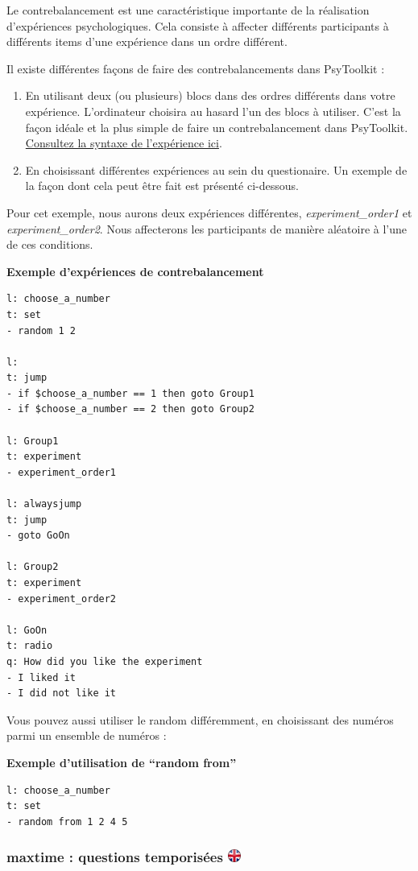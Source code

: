 \documentclass[
]{book}
\providecommand{\tightlist}{%
  \setlength{\itemsep}{0pt}\setlength{\parskip}{0pt}}
\begin{document}
Le contrebalancement est une caractéristique importante de la réalisation d'expériences psychologiques. Cela consiste à affecter différents participants à différents items d'une expérience dans un ordre différent.

Il existe différentes façons de faire des contrebalancements dans PsyToolkit :

\begin{enumerate}
\def\labelenumi{\arabic{enumi}.}
\tightlist
\item
  En utilisant deux (ou plusieurs) blocs dans des ordres différents dans votre expérience. L'ordinateur choisira au hasard l'un des blocs à utiliser. C'est la façon idéale et la plus simple de faire un contrebalancement dans PsyToolkit. \protect\hyperlink{blockorder}{Consultez la syntaxe de l'expérience ici}.
\item
  En choisissant différentes expériences au sein du questionaire. Un exemple de la façon dont cela peut être fait est présenté ci-dessous.
\end{enumerate}

Pour cet exemple, nous aurons deux expériences différentes, \emph{experiment\_order1} et \emph{experiment\_order2}. Nous affecterons les participants de manière aléatoire à l'une de ces conditions.

\textbf{Exemple d'expériences de contrebalancement}

\begin{verbatim}
l: choose_a_number
t: set
- random 1 2

l:
t: jump
- if $choose_a_number == 1 then goto Group1
- if $choose_a_number == 2 then goto Group2

l: Group1
t: experiment
- experiment_order1

l: alwaysjump
t: jump
- goto GoOn

l: Group2
t: experiment
- experiment_order2

l: GoOn
t: radio
q: How did you like the experiment
- I liked it
- I did not like it
\end{verbatim}

Vous pouvez aussi utiliser le random différemment, en choisissant des numéros parmi un ensemble de numéros :

\textbf{Exemple d'utilisation de ``random from''}

\begin{verbatim}
l: choose_a_number
t: set
- random from 1 2 4 5
\end{verbatim}

\hypertarget{maxtime-questions-temporisuxe9es}{%
\subsubsection[maxtime : questions temporisées ]{\texorpdfstring{maxtime : questions temporisées \href{https://www.psytoolkit.org/doc3.1.0/online-survey-syntax.html\#maxtime}{\protect\includegraphics{img/ukflag.png}}}{maxtime : questions temporisées }}\label{maxtime-questions-temporisuxe9es}}
\end{document}
